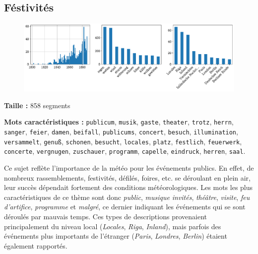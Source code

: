 \documentclass[a4paper,twoside,12pt]{article}
\begin{document}
\subsection{Féstivités} \label{topic3_féstivités}

\begin{figure}[H]
\centering
\includegraphics[width=\textwidth]{images/topic_charts_3.pdf}
\end{figure}

\begin{flushleft}
\textbf{Taille :} 858 segments

\textbf{Mots caractéristiques :} \texttt{publicum}, \texttt{musik}, \texttt{gaste}, \texttt{theater}, \texttt{trotz}, \texttt{herrn}, \texttt{sanger}, \texttt{feier}, \texttt{damen}, \texttt{beifall}, \texttt{publicums}, \texttt{concert}, \texttt{besuch}, \texttt{illumination}, \texttt{versammelt}, \texttt{genuß}, \texttt{schonen}, \texttt{besucht}, \texttt{locales}, \texttt{platz}, \texttt{festlich}, \texttt{feuerwerk}, \texttt{concerte}, \texttt{vergnugen}, \texttt{zuschauer}, \texttt{programm}, \texttt{capelle}, \texttt{eindruck}, \texttt{herren}, \texttt{saal}.
\end{flushleft}

\noindent Ce sujet reflète l'importance de la météo pour les événements publics. En effet, de nombreux rassemblements, festivités, défilés, foires, etc. se déroulant en plein air, leur succès dépendait fortement des conditions météorologiques. Les mots les plus caractéristiques de ce thème sont donc \textit{public}, \textit{musique} \textit{invités}, \textit{théâtre}, \textit{visite}, \textit{feu d'artifice}, \textit{programme} et \textit{malgré}, ce dernier indiquant les événements qui se sont déroulés par mauvais temps. Ces types de descriptions provenaient principalement du niveau local (\textit{Locales}, \textit{Riga}, \textit{Inland}), mais parfois des événements plus importants de l'étranger (\textit{Paris}, \textit{Londres}, \textit{Berlin}) étaient également rapportés.

\medskip
\end{document}

